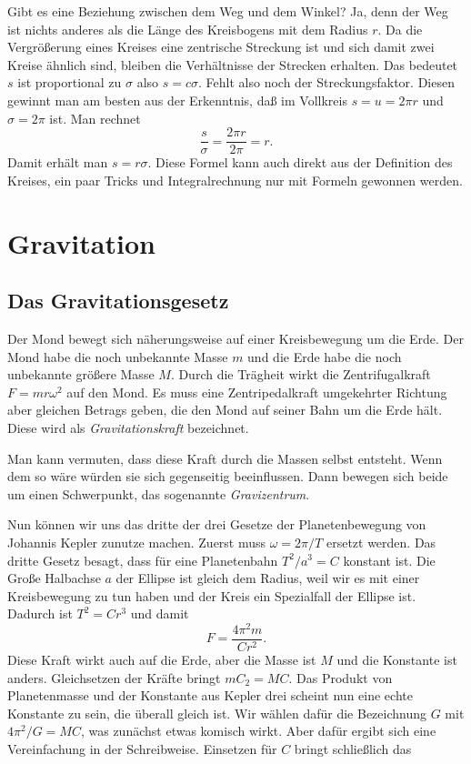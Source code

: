 \documentclass[a4paper,10pt,fleqn,twocolumn,twoside]{article}
\begin{document}
Gibt es eine Beziehung zwischen dem Weg und dem Winkel? Ja,
denn der Weg ist nichts anderes als die Länge des Kreisbogens
mit dem Radius \(r\). Da die Vergrößerung eines Kreises eine
zentrische Streckung ist und sich damit zwei Kreise ähnlich
sind, bleiben die Verhältnisse der Strecken erhalten.
Das bedeutet \(s\) ist proportional zu \(\sigma\) also \(s=c\sigma\).
Fehlt also noch der Streckungsfaktor. Diesen gewinnt man am besten
aus der Erkenntnis, daß im Vollkreis \(s=u=2\pi r\) und
\(\sigma = 2\pi\) ist. Man rechnet
\[\frac{s}{\sigma} = \frac{2\pi r}{2\pi} = r.\]
%
Damit erhält man \(s=r\sigma\). Diese Formel kann auch direkt
aus der Definition des Kreises, ein paar Tricks und Integralrechnung
nur mit Formeln gewonnen werden.

\section{Gravitation}

\subsection{Das Gravitationsgesetz}

Der Mond bewegt sich näherungsweise auf einer Kreisbewegung um die
Erde. Der Mond habe die noch unbekannte Masse \(m\) und die Erde habe
die noch unbekannte größere Masse \(M\). Durch die Trägheit wirkt die
Zentrifugalkraft \(F=mr\omega^2\) auf den Mond. Es muss eine
Zentripedalkraft umgekehrter Richtung aber gleichen Betrags geben,
die den Mond auf seiner Bahn um die Erde hält.
Diese wird als \textit{Gravitationskraft} bezeichnet.

Man kann vermuten, dass diese Kraft durch die Massen selbst entsteht.
Wenn dem so wäre würden sie sich gegenseitig beeinflussen. Dann
bewegen sich beide um einen Schwerpunkt,
das sogenannte \textit{Gravizentrum}.

Nun können wir uns das dritte der drei Gesetze der Planetenbewegung
von Johannis Kepler zunutze machen. Zuerst muss \(\omega=2\pi/T\)
ersetzt werden. Das dritte Gesetz besagt, dass für eine
Planetenbahn \(T^2/a^3=C\) konstant ist. Die Große Halbachse
\(a\) der Ellipse ist gleich dem Radius, weil wir es mit einer
Kreisbewegung zu tun haben und der Kreis ein Spezialfall der
Ellipse ist. Dadurch ist \(T^2=Cr^3\) und damit
\[F = \frac{4\pi^2 m}{Cr^2}.\]
Diese Kraft wirkt auch auf die Erde, aber die Masse ist \(M\)
und die Konstante ist anders. Gleichsetzen der Kräfte
bringt \(mC_2=MC\). Das Produkt von Planetenmasse und der Konstante
aus Kepler drei scheint nun eine echte Konstante zu sein, die überall
gleich ist. Wir wählen dafür
die Bezeichnung \(G\) mit \(4\pi^2/G=MC\), was zunächst etwas komisch
wirkt. Aber dafür ergibt sich eine Vereinfachung in der Schreibweise.
Einsetzen für \(C\) bringt schließlich das
\end{document}
